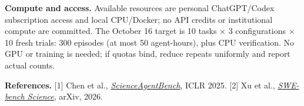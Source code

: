 \documentclass[11pt,letterpaper]{article}
\newcommand{\topic}[1]{\textbf{#1}\enspace}
\begin{document}
\topic{Compute and access.}
Available resources are personal ChatGPT/Codex subscription access and local CPU/Docker; no API credits or institutional compute are committed.
The October 16 target is 10 tasks $\times$ 3 configurations $\times$ 10 fresh trials: 300 episodes (at most 50 agent-hours), plus CPU verification. No GPU or training is needed; if quotas bind, reduce repeats uniformly and report actual counts.

\vspace{2pt}
{\fontsize{9}{10.2}\selectfont
\textbf{References.}
[1] Chen et al., \href{https://arxiv.org/abs/2410.05080}{\emph{ScienceAgentBench}}, ICLR 2025.
[2] Xu et al., \href{https://arxiv.org/abs/2608.19799}{\emph{SWE-bench Science}}, arXiv, 2026.
\par}
\end{document}

